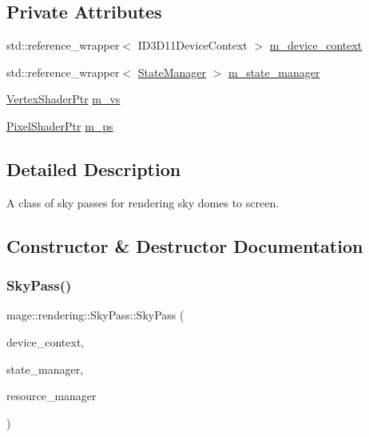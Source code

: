 \subsection*{Private Attributes}
\begin{DoxyCompactItemize}
\item 
std\+::reference\+\_\+wrapper$<$ I\+D3\+D11\+Device\+Context $>$ \hyperlink{classmage_1_1rendering_1_1_sky_pass_a5639f9eb6bf863074c5e5afba2f0e2f5}{m\+\_\+device\+\_\+context}
\item 
std\+::reference\+\_\+wrapper$<$ \hyperlink{classmage_1_1rendering_1_1_state_manager}{State\+Manager} $>$ \hyperlink{classmage_1_1rendering_1_1_sky_pass_aed4f451eb046158e856fdda6de9856f5}{m\+\_\+state\+\_\+manager}
\item 
\hyperlink{namespacemage_1_1rendering_aaf704b9c54a4181f4950a1761de69dda}{Vertex\+Shader\+Ptr} \hyperlink{classmage_1_1rendering_1_1_sky_pass_a935019dff57aaf9ae91f974ec59f11ee}{m\+\_\+vs}
\item 
\hyperlink{namespacemage_1_1rendering_af03d922b228ee9c8542baaa2ecc9f259}{Pixel\+Shader\+Ptr} \hyperlink{classmage_1_1rendering_1_1_sky_pass_a945613544f942b4278454a89bb5e1513}{m\+\_\+ps}
\end{DoxyCompactItemize}


\subsection{Detailed Description}
A class of sky passes for rendering sky domes to screen. 

\subsection{Constructor \& Destructor Documentation}
\hypertarget{classmage_1_1rendering_1_1_sky_pass_a55e8ef167a1e70a88a4be1fd11aed70e}{}\label{classmage_1_1rendering_1_1_sky_pass_a55e8ef167a1e70a88a4be1fd11aed70e} 
\subsubsection{\texorpdfstring{Sky\+Pass()}{SkyPass()}\hspace{0.1cm}{\footnotesize\ttfamily [1/3]}}
{\footnotesize\ttfamily mage\+::rendering\+::\+Sky\+Pass\+::\+Sky\+Pass (\begin{DoxyParamCaption}\item[{I\+D3\+D11\+Device\+Context \&}]{device\+\_\+context,  }\item[{\hyperlink{classmage_1_1rendering_1_1_state_manager}{State\+Manager} \&}]{state\+\_\+manager,  }\item[{\hyperlink{classmage_1_1rendering_1_1_resource_manager}{Resource\+Manager} \&}]{resource\+\_\+manager }\end{DoxyParamCaption})\hspace{0.3cm}{\ttfamily [explicit]}}


